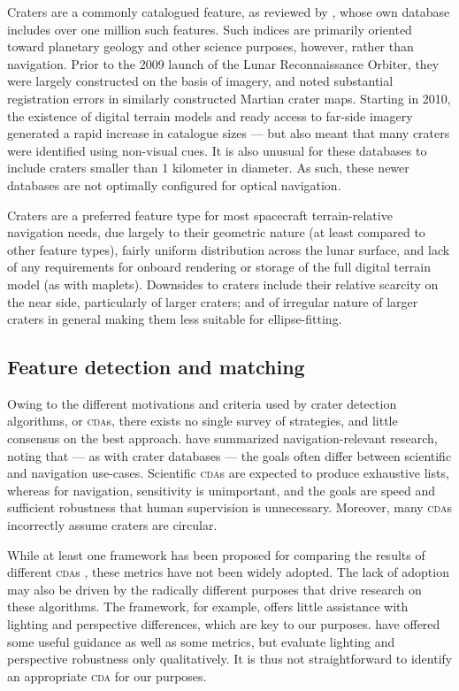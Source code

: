 \documentclass[12pt]{olfmemo}
\begin{document}
Craters are a commonly catalogued feature, as reviewed by \citet{Robbins2019}, whose own database includes over one million such features. Such indices are primarily oriented toward planetary geology and other science purposes, however, rather than navigation. Prior to the 2009 launch of the Lunar Reconnaissance Orbiter, they were largely constructed on the basis of imagery, and \citet{Salamuniccar2008} noted substantial registration errors in similarly constructed Martian crater maps. Starting in 2010, the existence of digital terrain models and ready access to far-side imagery generated a rapid increase in catalogue sizes --- but also meant that many craters were identified using non-visual cues. It is also unusual for these databases to include craters smaller than 1 kilometer in diameter. As such, these newer databases are not optimally configured for optical navigation.

Craters are a preferred feature type for most spacecraft terrain-relative navigation needs, due largely to their geometric nature (at least compared to other feature types), fairly uniform distribution across the lunar surface, and lack of any requirements for onboard rendering or storage of the full digital terrain model (as with maplets). Downsides to craters include their relative scarcity on the near side, particularly of larger craters; and of irregular nature of larger craters in general making them less suitable for ellipse-fitting.

\subsection{Feature detection and matching}
Owing to the different motivations and criteria used by crater detection algorithms, or \textsc{cda}s, there exists no single survey of strategies, and little consensus on the best approach. \citet{Christian2020} have summarized navigation-relevant research, noting that --- as with crater databases --- the goals often differ between scientific and navigation use-cases. Scientific \textsc{cda}s are expected to produce exhaustive lists, whereas for navigation, sensitivity is unimportant, and the goals are speed and sufficient robustness that human supervision is unnecessary. Moreover, many \textsc{cda}s incorrectly assume craters are circular.

While at least one framework has been proposed for comparing the results of different \textsc{cda}s \citep{Salamuniccar2008}, these metrics have not been widely adopted. The lack of adoption may also be driven by the radically different purposes that drive research on these algorithms. The \citet{Salamuniccar2008} framework, for example, offers little assistance with lighting and perspective differences, which are key to our purposes. \citet{Woicke2018} have offered some useful guidance as well as some metrics, but evaluate lighting and perspective robustness only qualitatively. It is thus not straightforward to identify an appropriate \textsc{cda} for our purposes.
\end{document}
